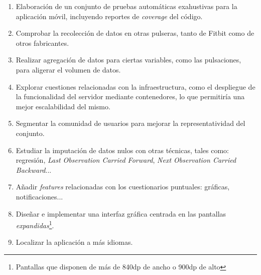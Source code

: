     \begin{enumerate}
        \item Elaboración de un conjunto de pruebas automáticas exahustivas para la aplicación móvil, incluyendo reportes de \textit{coverage} del código.
        \item Comprobar la recolección de datos en otras pulseras, tanto de Fitbit como de otros fabricantes.
        \item Realizar agregación de datos para ciertas variables, como las pulsaciones, para aligerar el volumen de datos.
        \item Explorar cuestiones relacionadas con la infraestructura, como el despliegue de la funcionalidad del servidor mediante contenedores, lo que permitiría una mejor escalabilidad del mismo.
        \item Segmentar la comunidad de usuarios para mejorar la representatividad del conjunto.
        \item Estudiar la imputación de datos nulos con otras técnicas, tales como: regresión, \textit{Last Observation 
        Carried Forward}, \textit{Next Observation Carried Backward}... \cite{gupta_null_nodate}
        \item Añadir \textit{features} relacionadas con los cuestionarios puntuales: gráficas, notificaciones...
        \item Diseñar e implementar una interfaz gráfica centrada en las pantallas \textit{expandidas}\footnote{Pantallas 
        que disponen de más de 840dp de ancho o 900dp de alto}.
        \item Localizar la aplicación a más idiomas.
    \end{enumerate}
